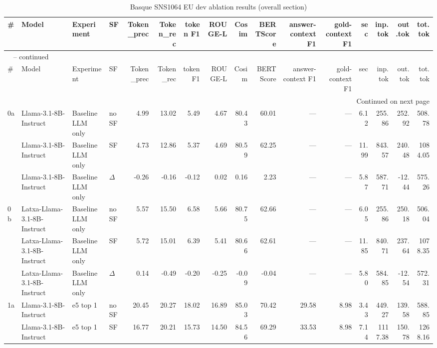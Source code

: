 \begin{landscape}
\begin{footnotesize}
\setlength{\LTcapwidth}{\linewidth}
\begin{longtable}{l l l l r r r r r r r r r r r r}
\caption{Basque SNS1064 EU dev ablation results (overall section)} \label{tab:eu-sns} \\
\toprule
\# & Model & Experiment & SF & Token\_prec & Token\_rec & token F1 & ROUGE-L & Cosim & BERTScore & answer-context F1 & gold-context F1 & sec & inp.tok & out.tok & tot.tok \\
\midrule
\endfirsthead
\multicolumn{16}{l}{\tablename\ \thetable{} -- continued} \\
\toprule
\# & Model & Experiment & SF & Token\_prec & Token\_rec & token F1 & ROUGE-L & Cosim & BERTScore & answer-context F1 & gold-context F1 & sec & inp.tok & out.tok & tot.tok \\
\midrule
\endhead
\midrule
\multicolumn{16}{r}{Continued on next page} \\
\endfoot
\bottomrule
\endlastfoot
0a & Llama-3.1-8B-Instruct & Baseline LLM only & noSF & 4.99 & 13.02 & 5.49 & 4.67 & 80.43 & 60.01 & --- & --- & 6.12 & 255.86 & 252.92 & 508.78 \\
 & Llama-3.1-8B-Instruct & Baseline LLM only & SF & 4.73 & 12.86 & 5.37 & 4.69 & 80.59 & 62.25 & --- & --- & 11.99 & 843.57 & 240.48 & 1084.05 \\
 & Llama-3.1-8B-Instruct & Baseline LLM only & $\Delta$ & -0.26 & -0.16 & -0.12 & 0.02 & 0.16 & 2.23 & --- & --- & 5.87 & 587.71 & -12.44 & 575.26 \\
0b & Latxa-Llama-3.1-8B-Instruct & Baseline LLM only & noSF & 5.57 & 15.50 & 6.58 & 5.66 & 80.75 & 62.66 & --- & --- & 6.05 & 255.86 & 250.18 & 506.04 \\
 & Latxa-Llama-3.1-8B-Instruct & Baseline LLM only & SF & 5.72 & 15.01 & 6.39 & 5.41 & 80.66 & 62.61 & --- & --- & 11.85 & 840.71 & 237.64 & 1078.35 \\
 & Latxa-Llama-3.1-8B-Instruct & Baseline LLM only & $\Delta$ & 0.14 & -0.49 & -0.20 & -0.25 & -0.09 & -0.04 & --- & --- & 5.80 & 584.85 & -12.54 & 572.31 \\
\midrule
1a & Llama-3.1-8B-Instruct & e5 top 1 & noSF & 20.45 & 20.27 & 18.02 & 16.89 & 85.03 & 70.42 & 29.58 & 8.98 & 3.43 & 449.27 & 139.58 & 588.85 \\
 & Llama-3.1-8B-Instruct & e5 top 1 & SF & 16.77 & 20.21 & 15.73 & 14.50 & 84.56 & 69.29 & 33.53 & 8.98 & 7.14 & 1117.38 & 150.78 & 1268.16 \\

\end{longtable}
\end{footnotesize}
\end{landscape}
